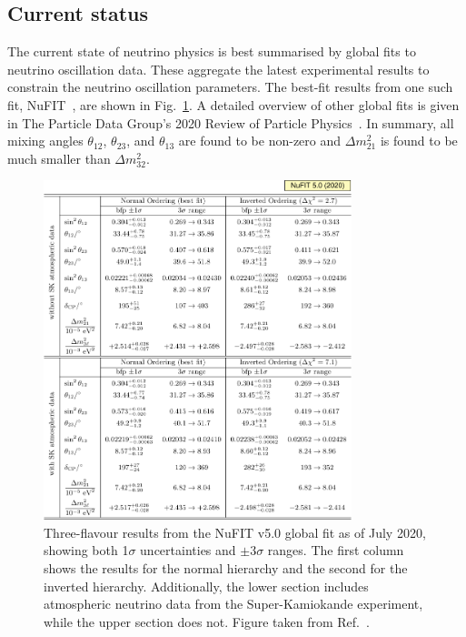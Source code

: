 \subsection{Current status} %
\label{sec:theory_status_current} %

The current state of neutrino physics is best summarised by global fits to neutrino oscillation
data. These aggregate the latest experimental results to constrain the neutrino oscillation
parameters. The best-fit results from one such fit, NuFIT~\cite{esteban2019,esteban2020}, are
shown in Fig.~\ref{fig:best_fit}. A detailed overview of other global fits is given in The
Particle Data Group's 2020 Review of Particle Physics~\cite{particle2020}. In summary, all mixing
angles $\theta_{12}$, $\theta_{23}$, and $\theta_{13}$ are found to be non-zero and $\Delta
    m^{2}_{21}$ is found to be much smaller than $\Delta m^{2}_{32}$.

\begin{figure} %
    \includegraphics[origin=c,width=0.8\textwidth]{diagrams/3-theory/best_fit.pdf}
    \caption[Three-flavour results from the NuFIT v5.0 global neutrino oscillation fit]
    {Three-flavour results from the NuFIT v5.0 global fit as of July 2020, showing both 1$\sigma$
        uncertainties and $\pm 3 \sigma$ ranges. The first column shows the results for the normal
        hierarchy and the second for the inverted hierarchy. Additionally, the lower section
        includes atmospheric neutrino data from the Super-Kamiokande experiment, while the upper
        section does not. Figure taken from Ref.~\cite{esteban2020}.}
    \label{fig:best_fit}
\end{figure}


